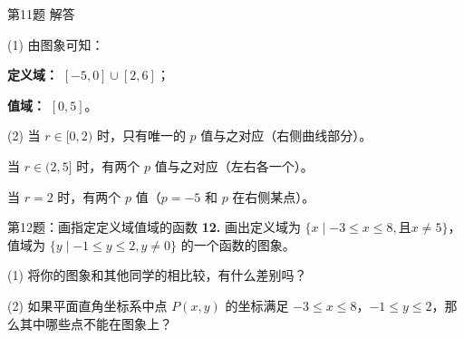 \documentclass[10pt,aspectratio=169,serif]{beamer}
\begin{document}
\begin{frame}[t]{第11题 解答}
\begin{tcolorbox}[colback=orange!10,colframe=orange,title=\textbf{解}]
(1) 由图象可知：

\vspace{0.3em}
\textbf{定义域：} $[-5,0]\cup[2,6]$；

\vspace{0.3em}
\textbf{值域：} $[0,5]$。

\vspace{1em}
(2) 当 $r\in[0,2)$ 时，只有唯一的 $p$ 值与之对应（右侧曲线部分）。

\vspace{0.3em}
当 $r\in(2,5]$ 时，有两个 $p$ 值与之对应（左右各一个）。

\vspace{0.3em}
当 $r=2$ 时，有两个 $p$ 值（$p=-5$ 和 $p$ 在右侧某点）。
\end{tcolorbox}
\end{frame}

\begin{frame}[t]{第12题：画指定定义域值域的函数}
\textbf{12.} 画出定义域为 $\{x\mid -3\le x\le 8,且 x\ne 5\}$，值域为 $\{y\mid -1\le y\le 2, y\ne 0\}$ 的一个函数的图象。

\vspace{0.5em}
(1) 将你的图象和其他同学的相比较，有什么差别吗？

\vspace{0.5em}
(2) 如果平面直角坐标系中点 $P(x,y)$ 的坐标满足 $-3\le x\le 8$，$-1\le y\le 2$，那么其中哪些点不能在图象上？
\end{frame}
\end{document}
